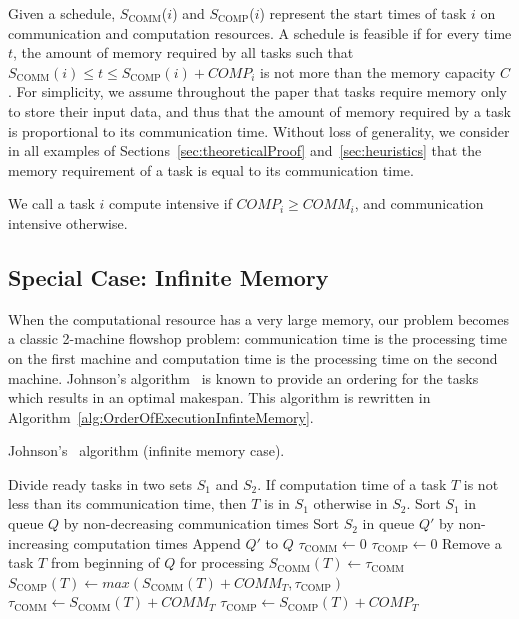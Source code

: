 \documentclass[sigconf]{acmart}
\newcommand{\scomm}{\ensuremath{{S}_{\text{COMM}}}}
\newcommand{\scomp}{\ensuremath{{S}_{\text{COMP}}}}
\begin{document}
	
	Given a schedule, \scomm($i$) and \scomp($i$) represent the
	start times of task $i$ on communication and computation
	resources. A schedule is feasible if for every time $t$, the
	amount of memory required by all tasks such that $\scomm(i) \leq t
	\leq \scomp(i) + COMP_i$ is not more than the memory capacity
	$C$. 
	For simplicity, we assume throughout the paper that tasks
	require memory only to store their input data, and thus that
	the amount of memory required by a task is proportional to its
	communication time. Without loss of generality, we consider in
	all examples of Sections~\ref{sec:theoreticalProof}
	and~\ref{sec:heuristics} that the memory requirement of a task
	is equal to its communication time.
	
	We call a task $i$ compute intensive if $COMP_i \ge COMM_i$, and
	communication intensive otherwise.
	
	\subsection{Special Case: Infinite Memory}
	
	When the computational resource has a very large memory, our problem
	becomes a classic 2-machine flowshop problem: communication time is
	the processing time on the first machine and computation time is the
	processing time on the second machine. Johnson's
	algorithm~\cite{johnson} is known to provide an ordering for the tasks
	which results in an optimal makespan. This algorithm is rewritten in
	Algorithm~\ref{alg:OrderOfExecutionInfinteMemory}.
	
	\begin{algorithm}
		\caption{\label{alg:OrderOfExecutionInfinteMemory}Johnson's~\cite{johnson} algorithm (infinite memory case).}
		\begin{algorithmic}[1]
			\STATE Divide ready tasks in two sets $S_1$ and $S_2$. If computation time of a task $T$ is not less than its communication time, then $T$ is in $S_1$ otherwise in $S_2$.
			\STATE Sort $S_1$ in queue $Q$ by non-decreasing communication times
			\STATE Sort $S_2$ in queue $Q'$ by non-increasing computation times
			\STATE Append $Q'$ to $Q$
			\STATE $\tau_{\text{COMM}} \gets 0$ \hfill{}
			\STATE $\tau_{\text{COMP}} \gets 0$\hfill {}
			\STATE Remove a task $T$ from beginning of $Q$ for processing
			\STATE $\scomm(T) \gets \tau_{\text{COMM}}$
			\STATE $\scomp(T) \gets max(\scomm(T) + COMM_T, \tau_{\text{COMP}})$
			\STATE $\tau_{\text{COMM}} \gets \scomm(T) + COMM_T$
			\STATE $\tau_{\text{COMP}} \gets \scomp(T) + COMP_T$
			\ENDWHILE
		\end{algorithmic}
	\end{algorithm}
	
\end{document}
